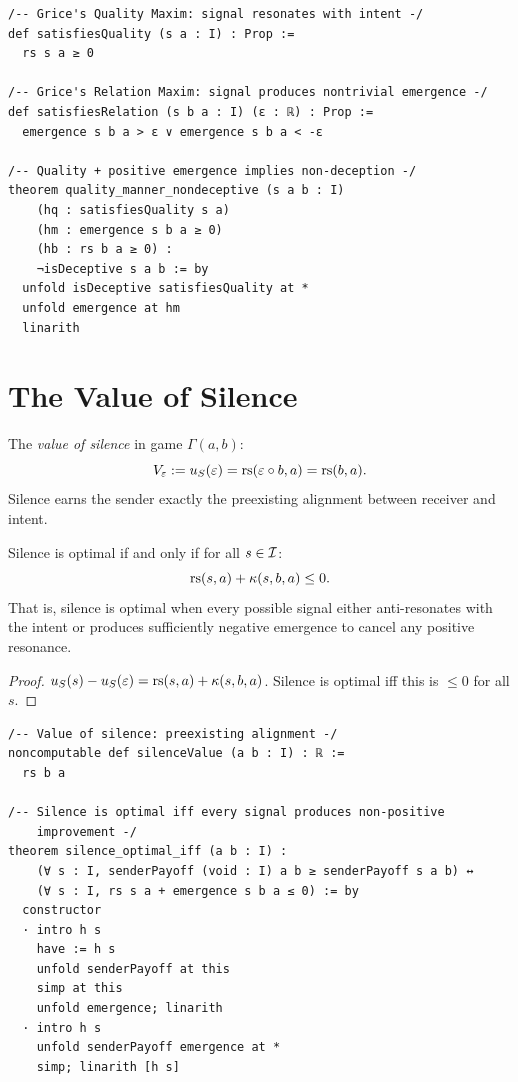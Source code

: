 \begin{lstlisting}[caption={Lean 4: Gricean quality as non-deception}]
/-- Grice's Quality Maxim: signal resonates with intent -/
def satisfiesQuality (s a : I) : Prop :=
  rs s a ≥ 0

/-- Grice's Relation Maxim: signal produces nontrivial emergence -/
def satisfiesRelation (s b a : I) (ε : ℝ) : Prop :=
  emergence s b a > ε ∨ emergence s b a < -ε

/-- Quality + positive emergence implies non-deception -/
theorem quality_manner_nondeceptive (s a b : I)
    (hq : satisfiesQuality s a)
    (hm : emergence s b a ≥ 0)
    (hb : rs b a ≥ 0) :
    ¬isDeceptive s a b := by
  unfold isDeceptive satisfiesQuality at *
  unfold emergence at hm
  linarith
\end{lstlisting}


\section{The Value of Silence}

\begin{definition}
\label{def:silence-value}
The \emph{value of silence} in game $\Gamma(a, b)$:
\[
V_\varepsilon := u_S(\varepsilon) = \mathrm{rs}(\varepsilon \circ b, a) = \mathrm{rs}(b, a).
\]
Silence earns the sender exactly the preexisting alignment between receiver
and intent.
\end{definition}

\begin{theorem}
\label{thm:wittgenstein-silence}
Silence is optimal if and only if for all $s \in \mathcal{I}$:
\[
\mathrm{rs}(s, a) + \kappa(s, b, a) \leq 0.
\]
That is, silence is optimal when every possible signal either anti-resonates
with the intent or produces sufficiently negative emergence to cancel any
positive resonance.
\end{theorem}

\begin{proof}
$u_S(s) - u_S(\varepsilon) = \mathrm{rs}(s,a) + \kappa(s,b,a)$. Silence is optimal iff
this is $\leq 0$ for all $s$.
\end{proof}

\begin{lstlisting}[caption={Lean 4: Wittgenstein's Silence Principle}]
/-- Value of silence: preexisting alignment -/
noncomputable def silenceValue (a b : I) : ℝ :=
  rs b a

/-- Silence is optimal iff every signal produces non-positive
    improvement -/
theorem silence_optimal_iff (a b : I) :
    (∀ s : I, senderPayoff (void : I) a b ≥ senderPayoff s a b) ↔
    (∀ s : I, rs s a + emergence s b a ≤ 0) := by
  constructor
  · intro h s
    have := h s
    unfold senderPayoff at this
    simp at this
    unfold emergence; linarith
  · intro h s
    unfold senderPayoff emergence at *
    simp; linarith [h s]
\end{lstlisting}


